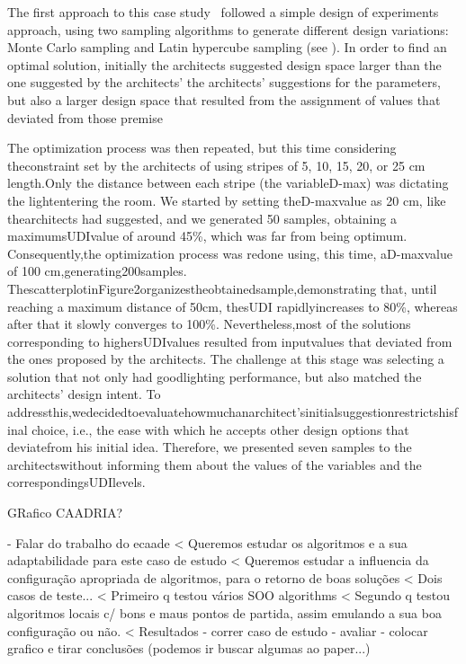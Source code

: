The first approach to this case study~\cite{Caetano2018} followed a simple design of experiments approach, using two sampling algorithms to generate different design variations: Monte Carlo sampling and Latin hypercube sampling (see ). In order to find an optimal solution, initially the architects suggested 
design space larger than the one suggested by the architects' the architects’ suggestions for the parameters, but also a larger design space that resulted from the assignment of values that deviated from those premise

The optimization process was then repeated, but this time considering theconstraint set by the architects of using stripes of 5, 10, 15, 20, or 25 cm length.Only the distance between each stripe (the variableD-max) was dictating the lightentering the room. We started by setting theD-maxvalue as 20 cm, like thearchitects had suggested, and we generated 50 samples, obtaining a maximumsUDIvalue of around 45\%, which was far from being optimum. Consequently,the optimization process was redone using, this time, aD-maxvalue of 100 cm,generating200samples. ThescatterplotinFigure2organizestheobtainedsample,demonstrating that, until reaching a maximum distance of 50cm, thesUDI rapidlyincreases to 80\%, whereas after that it slowly converges to 100\%. Nevertheless,most of the solutions corresponding to highersUDIvalues resulted from inputvalues that deviated from the ones proposed by the architects. 
The challenge at this stage was selecting a solution that not only had goodlighting performance, but also matched the architects’ design intent. To addressthis,wedecidedtoevaluatehowmuchanarchitect’sinitialsuggestionrestrictshisfinal choice, i.e., the ease with which he accepts other design options that deviatefrom his initial idea. Therefore, we presented seven samples to the architectswithout informing them about the values of the variables and the correspondingsUDIlevels. 

\ac{GRafico CAADRIA?}

- Falar do trabalho do ecaade
< Queremos estudar os algoritmos e a sua adaptabilidade para este caso de estudo
< Queremos estudar a influencia da configuração apropriada de algoritmos, para o retorno de boas soluções
< Dois casos de teste...
< Primeiro q testou vários \ac{SOO} algorithms
< Segundo q testou algoritmos locais c/ bons e maus pontos de partida, assim emulando a sua boa configuração ou não. 
< Resultados
- correr caso de estudo 
- avaliar 
- colocar grafico e tirar conclusões (podemos ir buscar algumas ao paper...)

